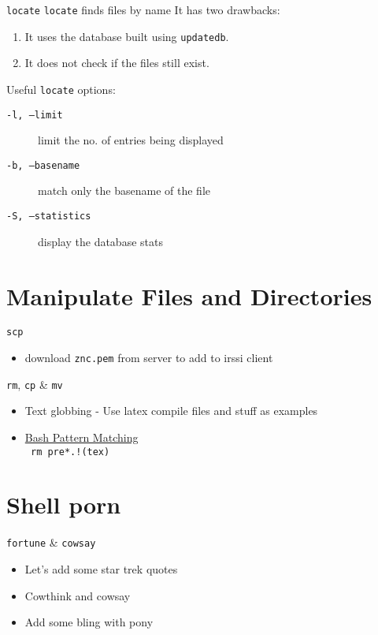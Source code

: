 \documentclass[11pt]{beamer}
\begin{document}
			\begin{frame}{ \texttt{locate}}
				\texttt{locate} finds files by name
				It has two drawbacks:
				\begin{enumerate}
					\item It uses the database built using \texttt{updatedb}.
					\item It does not check if the files still exist.
				\end{enumerate}
				Useful \texttt{locate} options:
				\begin{description}
					\item[ \texttt{-l, --limit}] limit the no. of entries being displayed
					\item[ \texttt{-b, --basename}] match only the basename of the file
					\item[ \texttt{-S, --statistics}] display the database stats
				\end{description}
			\end{frame}
	
	\section[Manipulate]{Manipulate Files and Directories}
			\begin{frame}{ \texttt{scp}}
				\begin{itemize}
					\item download \texttt{znc.pem} from server to add to irssi client
				\end{itemize}			
			\end{frame}

			\begin{frame}{ \texttt{rm}, \texttt{cp} \& \texttt{mv}}
				\begin{itemize}
					\item Text globbing - Use latex compile files and stuff as examples
					\item \href{https://www.gnu.org/software/bash/manual/bashref.html#Pattern-Matching}{Bash Pattern Matching} \\
						\texttt{ rm pre*.!(tex) }
				\end{itemize}	
			\end{frame}

	\section[Bling]{Shell porn}
		\begin{frame}{\texttt{fortune} \& \texttt{cowsay}}
			\begin{itemize}
				\item Let's add some star trek quotes
				\item Cowthink and cowsay
				\item Add some bling with pony
			\end{itemize}
		\end{frame}
\end{document}
